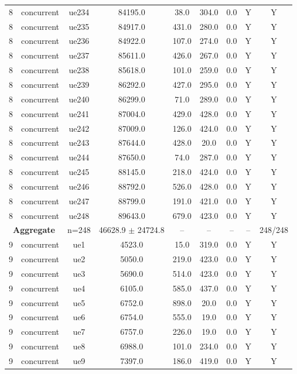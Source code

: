 \begin{table}[ht]
\begin{tabular}{|c|c|c|c|c|c|c|c|c|}
8 & concurrent & ue234 & 84195.0 & 38.0 & 304.0 & 0.0 & Y & Y \\
8 & concurrent & ue235 & 84917.0 & 431.0 & 280.0 & 0.0 & Y & Y \\
8 & concurrent & ue236 & 84922.0 & 107.0 & 274.0 & 0.0 & Y & Y \\
8 & concurrent & ue237 & 85611.0 & 426.0 & 267.0 & 0.0 & Y & Y \\
8 & concurrent & ue238 & 85618.0 & 101.0 & 259.0 & 0.0 & Y & Y \\
8 & concurrent & ue239 & 86292.0 & 427.0 & 295.0 & 0.0 & Y & Y \\
8 & concurrent & ue240 & 86299.0 & 71.0 & 289.0 & 0.0 & Y & Y \\
8 & concurrent & ue241 & 87004.0 & 429.0 & 428.0 & 0.0 & Y & Y \\
8 & concurrent & ue242 & 87009.0 & 126.0 & 424.0 & 0.0 & Y & Y \\
8 & concurrent & ue243 & 87644.0 & 428.0 & 20.0 & 0.0 & Y & Y \\
8 & concurrent & ue244 & 87650.0 & 74.0 & 287.0 & 0.0 & Y & Y \\
8 & concurrent & ue245 & 88145.0 & 218.0 & 424.0 & 0.0 & Y & Y \\
8 & concurrent & ue246 & 88792.0 & 526.0 & 428.0 & 0.0 & Y & Y \\
8 & concurrent & ue247 & 88799.0 & 191.0 & 421.0 & 0.0 & Y & Y \\
8 & concurrent & ue248 & 89643.0 & 679.0 & 423.0 & 0.0 & Y & Y \\
\multicolumn{2}{|c|}{\textbf{Aggregate}} & n=248 & 46628.9 $\pm$ 24724.8 & -- & -- & -- & -- & 248/248 \\
\hline
9 & concurrent & ue1 & 4523.0 & 15.0 & 319.0 & 0.0 & Y & Y \\
9 & concurrent & ue2 & 5050.0 & 219.0 & 423.0 & 0.0 & Y & Y \\
9 & concurrent & ue3 & 5690.0 & 514.0 & 423.0 & 0.0 & Y & Y \\
9 & concurrent & ue4 & 6105.0 & 585.0 & 437.0 & 0.0 & Y & Y \\
9 & concurrent & ue5 & 6752.0 & 898.0 & 20.0 & 0.0 & Y & Y \\
9 & concurrent & ue6 & 6754.0 & 555.0 & 19.0 & 0.0 & Y & Y \\
9 & concurrent & ue7 & 6757.0 & 226.0 & 19.0 & 0.0 & Y & Y \\
9 & concurrent & ue8 & 6988.0 & 101.0 & 234.0 & 0.0 & Y & Y \\
9 & concurrent & ue9 & 7397.0 & 186.0 & 419.0 & 0.0 & Y & Y \\

\end{tabular}
\end{table}
